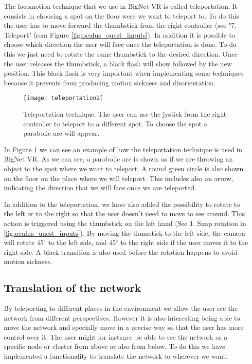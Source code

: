 The locomotion technique that we use in BigNet VR is called teleportation. It consists in choosing a spot on the floor were we want to teleport to. To do this the user has to move forward the thumbstick from the right controller (see "7. Teleport" from Figure \ref{fig:oculus_quest_inputs}). In addition it is possible to choose which direction the user will face once the teleportation is done. To do this we just need to rotate the same thumbstick to the desired direction. Once the user releases the thumbstick, a black flash will show followed by the new position. This black flash is very important when implementing some techniques because it prevents from producing motion sickness and disorientation.

\begin{figure}[h!]
    \centering%
    \texttt{[image: teleportation2]}
    \caption{Teleportation technique. The user can use the jystick from the right controller to teleport to a different spot. To choose the spot a parabolic arc will appear.}
    \label{fig:teleportation}
\end{figure}%

In Figure \ref{fig:teleportation} we can see an example of how the teleportation technique is used in BigNet VR. As we can see, a parabolic arc is shown as if we are throwing an object to the spot where we want to teleport. A round green circle is also shown on the floor on the place where we will teleport. This includes also an arrow, indicating the direction that we will face once we are teleported.

In addition to the teleportation, we have also added the possibility to rotate to the left or to the right so that the user doesn't need to move to see around. This action is triggered using the thumbstick on the left hand (See 1. Snap rotation in \ref{fig:oculus_quest_inputs}). By moving the thumstick to the left side, the camera will rotate 45$^{\circ}$ to the left side, and 45$^{\circ}$ to the right side if the user moves it to the right side. A black transition is also used before the rotation happens to avoid motion sickness.

\subsection{Translation of the network}
By teleporting to different places in the environment we allow the user see the network from different perspectives. However it is also interesting being able to move the network and specially move in a precise way so that the user has more control over it. The user might for instance be able to see the network or a specific node or cluster from above or also from below. To do this we have implemented a functionality to translate the network to wherever we want.

